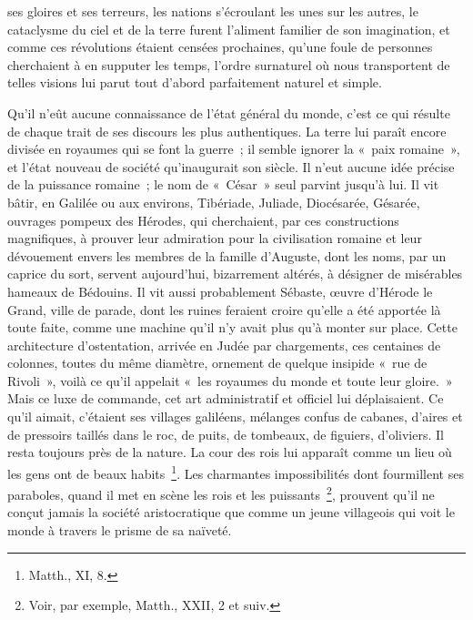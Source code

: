 \documentclass[french,twoside]{book} %
\begin{document}
ses gloires et ses terreurs, les nations s’écroulant les unes sur les autres, le cataclysme du ciel et de la terre furent l’aliment familier de son imagination, et comme ces révolutions étaient censées prochaines, qu’une foule de personnes cherchaient à en supputer les temps, l’ordre surnaturel où nous transportent de telles visions lui parut tout d’abord parfaitement naturel et simple.\par
Qu’il n’eût aucune connaissance de l’état général du monde, c’est ce qui résulte de chaque trait de ses discours les plus authentiques. La terre lui paraît encore divisée en royaumes qui se font la guerre ; il semble ignorer la « paix romaine », et l’état nouveau de société qu’inaugurait son siècle. Il n’eut aucune idée précise de la puissance romaine ; le nom de « César » seul parvint jusqu’à lui. Il vit bâtir, en Galilée ou aux environs, Tibériade, Juliade, Diocésarée, Gésarée, ouvrages pompeux des Hérodes, qui cherchaient, par ces constructions magnifiques, à prouver leur admiration pour la civilisation romaine et leur dévouement envers les membres de la famille d’Auguste, dont les noms, par un caprice du sort, servent aujourd’hui, bizarrement altérés, à désigner de misérables hameaux de Bédouins. Il vit aussi probablement Sébaste, œuvre d’Hérode le Grand, ville de parade, dont les ruines feraient croire qu’elle a été apportée là toute faite, comme une machine qu’il n’y avait plus qu’à monter sur place. Cette architecture d’ostentation, arrivée en Judée par chargements, ces centaines de colonnes, toutes du même diamètre, ornement de quelque insipide « rue de Rivoli », voilà ce qu’il appelait « les royaumes du monde et toute leur gloire. » Mais ce luxe de commande, cet art administratif et officiel lui déplaisaient. Ce qu’il aimait, c’étaient ses villages galiléens, mélanges confus de cabanes, d’aires et de pressoirs taillés dans le roc, de puits, de tombeaux, de figuiers, d’oliviers. Il resta toujours près de la nature. La cour des rois lui apparaît comme un lieu où les gens ont de beaux habits \footnote{Matth., XI, 8.}. Les charmantes impossibilités dont fourmillent ses paraboles, quand il met en scène les rois et les puissants \footnote{Voir, par exemple, Matth., XXII, 2 et suiv.}, prouvent qu’il ne conçut jamais la société aristocratique que comme un jeune villageois qui voit le monde à travers le prisme de sa naïveté.\par
\end{document}
